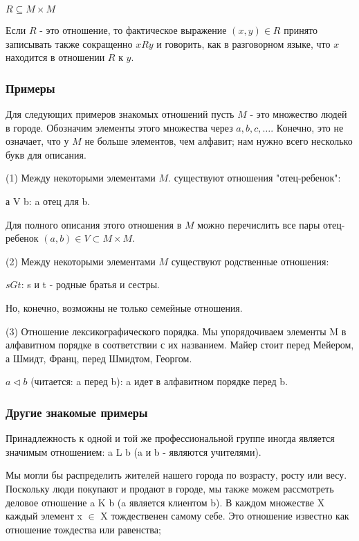 \vspace{0.5cm}
\(R \subseteq M \times M\)

\vspace{0.5cm}

Если \(R\) - это отношение, то фактическое выражение \((x,y) \in R\) принято записывать также сокращенно \(xRy\) и говорить, как в разговорном языке, что \(x\) находится в отношении \(R\) к \(y\).

\subsubsection{Примеры}
Для следующих примеров знакомых отношений пусть \(M\) - это множество людей в городе. Обозначим элементы этого множества через \(a,b,c,\dots\). Конечно, это не означает, что у \(M\) не больше элементов, чем алфавит; нам нужно всего несколько букв для описания.

(1) Между некоторыми элементами \(M\). существуют отношения "отец-ребенок":

а V b: a отец для b.

Для полного описания этого отношения в \(M\) можно перечислить все пары отец-ребенок  \((a,b) \in V \subset M \times M\).

(2) Между некоторыми элементами \(M\) существуют родственные отношения:

\(sGt\): s и t - родные братья и сестры.

Но, конечно, возможны не только семейные отношения.

(3) Отношение лексикографического порядка. Мы упорядочиваем элементы M в алфавитном порядке в соответствии с их названием. Майер стоит перед Мейером, а Шмидт, Франц, перед Шмидтом, Георгом.

\(a \lhd b\) (читается: a перед b): a идет в алфавитном порядке перед b.

\subsubsection{Другие знакомые примеры}
Принадлежность к одной и той же профессиональной группе иногда является значимым отношением: a L b (a и b - являются учителями).

Мы могли бы распределить жителей нашего города по возрасту, росту или весу. Поскольку люди покупают и продают в городе, мы также можем рассмотреть деловое отношение a K b (a является клиентом b).
В каждом множестве X каждый элемент x \(\in\) X тождественен самому себе. Это отношение известно как отношение тождества или равенства;


